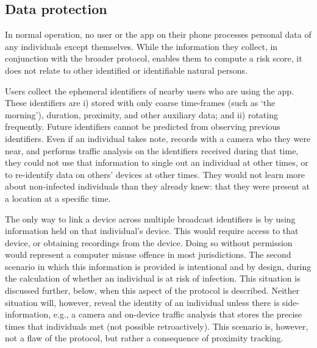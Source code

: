 \documentclass[12pt,a4paper]{article}
\begin{document}
\subsection*{Data protection}
In normal operation, no user or the app on their phone processes personal data of any
individuals except themselves. While the information they collect, in conjunction with the broader protocol, enables them to compute a risk score, it does not relate to other identified or identifiable natural persons.


Users collect the ephemeral identifiers of nearby users who are using the app. These
identifiers are i) stored with only coarse time-frames (such as ‘the morning’), duration,
proximity, and other auxiliary data; and ii) rotating frequently. Future identifiers cannot be predicted from observing previous identifiers. Even if an individual takes note, records with a camera who they were near, and performs traffic analysis on the identifiers received during that time, they could not use that information to single out an individual at other times, or to re-identify data on others’ devices at other times. They would not learn more about non-infected individuals than they already knew: that they were present at a location at a specific time.


The only way to link a device across multiple broadcast identifiers is by using information held on that individual’s device. This would require access to that device, or obtaining recordings from the device. Doing so without permission would represent a computer misuse offence in most jurisdictions. The second scenario in which this information is provided is intentional and by design, during the calculation of whether an individual is at risk of infection. This situation is discussed further, below, when this aspect of the protocol is described. Neither situation will, however, reveal the identity of an individual unless there is side-information, e.g., a camera and on-device traffic analysis that stores the precise times that individuals met (not possible retroactively). This scenario is, however, not a flaw of the protocol, but rather a consequence of proximity tracking.
\end{document}
